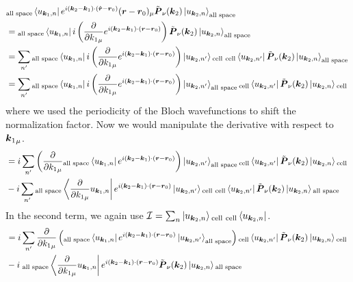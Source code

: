 \documentclass{report}
\renewcommand\vec[1]{\ensuremath\boldsymbol{#1}} %
\begin{document}
$$
\begin{aligned}
& {}_{\text{all space}}\bra{ u_{\vec{k}_1,n}} e^{i (\vec{k}_2 - \vec{k}_1)\cdot(\hat{\vec{r}} - \vec{r}_0)} (\vec{r} - \vec{r}_0)_\mu \tilde{\vec{P}}_\nu (\vec{k}_2) \ket{u_{\vec{k}_2,n}}_{\text{all space}} \\
&= 
{}_{\text{all space}}\bra{ u_{\vec{k}_1,n}} i \left(\frac{\partial}{\partial {k_1}_\mu}e^{i (\vec{k}_2 - \vec{k}_1)\cdot(\vec{r} - \vec{r}_0)}\right)  \tilde{\vec{P}}_\nu (\vec{k}_2) \ket{u_{\vec{k}_2,n}}_{\text{all space}} \\
& = \sum_{n'} {}_{\text{all space}}\bra{ u_{\vec{k}_1,n}} i \left(\frac{\partial}{\partial {k_1}_\mu}e^{i (\vec{k}_2 - \vec{k}_1)\cdot(\vec{r} - \vec{r}_0)}\right) \ket{u_{\vec{k}_2,n'}} {}_{\text{cell }}  {}_{\text{cell}} \bra{u_{\vec{k}_2,n'}} \tilde{\vec{P}}_\nu (\vec{k}_2) \ket{u_{\vec{k}_2,n}}_{\text{all space}} \\
& = \sum_{n'} {}_{\text{all space}}\bra{ u_{\vec{k}_1,n}} i \left(\frac{\partial}{\partial {k_1}_\mu}e^{i (\vec{k}_2 - \vec{k}_1)\cdot(\vec{r} - \vec{r}_0)}\right) \ket{u_{\vec{k}_2,n'}}_{\text{all space}}   {}_{\text{cell}} \bra{u_{\vec{k}_2,n'}} \tilde{\vec{P}}_\nu (\vec{k}_2) \ket{u_{\vec{k}_2,n}}{}_{\text{cell }}
\end{aligned}
$$
where we used the periodicity of the Bloch wavefunctions to shift the normalization factor. Now we would manipulate the derivative with respect to ${\vec{k}_1}_\mu$.
$$
\begin{aligned}
& = i \sum_{n'} \left(\frac{\partial}{\partial {k_1}_\mu}{}_{\text{all space}}\bra{ u_{\vec{k}_1,n}} e^{i (\vec{k}_2 - \vec{k}_1)\cdot(\vec{r} - \vec{r}_0)}\right) \ket{u_{\vec{k}_2,n'}}_{\text{all space}} {}_{\text{cell}} \bra{u_{\vec{k}_2,n'}} \tilde{\vec{P}}_\nu (\vec{k}_2) \ket{u_{\vec{k}_2,n}}{}_{\text{cell }} \\
& - i \sum_{n'} {}_{\text{all space}}\bra{\frac{\partial}{\partial {k_1}_\mu}u_{\vec{k}_1,n}} e^{i (\vec{k}_2 - \vec{k}_1)\cdot(\vec{r} - \vec{r}_0)} \ket{u_{\vec{k}_2,n'}}{}_{\text{cell }}  {}_{\text{cell}} \bra{u_{\vec{k}_2,n'}} \tilde{\vec{P}}_\nu (\vec{k}_2) \ket{u_{\vec{k}_2,n}}{}_{\text{all space}} \\
\end{aligned}
$$
In the second term, we again use $\mathcal{I} = \sum_n \ket{u_{\vec{k}_2, n}} {}_{\text{cell }}  {}_{\text{cell}}\bra{u_{\vec{k}_2, n}}$.
$$
\begin{aligned}
	& = i \sum_{n'} \frac{\partial}{\partial {k_1}_\mu}\left({}_{\text{all space}}\bra{ u_{\vec{k}_1,n}} e^{i (\vec{k}_2 - \vec{k}_1)\cdot(\vec{r} - \vec{r}_0)} \ket{u_{\vec{k}_2,n'}}_{\text{all space}}\right) {}_{\text{cell}} \bra{u_{\vec{k}_2,n'}} \tilde{\vec{P}}_\nu (\vec{k}_2) \ket{u_{\vec{k}_2,n}}{}_{\text{cell }} \\
	& - i {}_{\text{  all space}}\bra{\frac{\partial}{\partial {k_1}_\mu}u_{\vec{k}_1,n}} e^{i (\vec{k}_2 - \vec{k}_1)\cdot(\vec{r} - \vec{r}_0)} \tilde{\vec{P}}_\nu (\vec{k}_2) \ket{u_{\vec{k}_2,n}}{}_{\text{all space}} \\
\end{aligned}
$$
\end{document}
